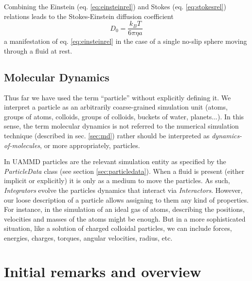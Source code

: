 \documentclass[ twoside,openright,titlepage,numbers=noenddot,%
headinclude,footinclude,cleardoublepage=empty,abstract=on,
BCOR=5mm,paper=a4,fontsize=11pt, dvipsnames
]{scrreprt}
\newcommand{\uammd}{\gls{UAMMD}\xspace}
\newcommand{\kT}{k_B T}
\begin{document}
Combining the Einstein (eq. \eqref{eq:einsteinrel}) and Stokes (eq. \eqref{eq:stokesrel}) relations leads to the Stokes-Einstein diffusion coefficient
\begin{equation}
  \label{eq:spherediff}
  D_0 = \frac{\kT}{6\pi\eta a}
\end{equation}
a manifestation of eq. \eqref{eq:einsteinrel} in the case of a single no-slip sphere moving through a fluid at rest.


\section{\uppercase{{\bfseries M}}olecular \uppercase{\textbf{D}}ynamics}\label{sec:dynmol}
Thus far we have used the term ``particle'' without explicitly defining it. We interpret a particle as an arbitrarily coarse-grained simulation unit (atoms, groups of atoms, colloids, groups of colloids, buckets of water, planets...). In this sense, the term molecular dynamics is not referred to the numerical simulation technique (described in sec. \ref{sec:md}) rather should be interpreted as \emph{dynamics-of-molecules}, or more appropriately, particles.

In \uammd particles are the relevant simulation entity as specified by the \emph{ParticleData} class (see section \ref{sec:particledata}). When a fluid is present (either implicit or explicitly) it is only as a medium to move the particles. As such, \emph{Integrators} evolve the particles dynamics that interact via \emph{Interactors}. However, our loose description of a particle allows assigning to them any kind of properties. For instance, in the simulation of an ideal gas of atoms, describing the positions, velocities and masses of the atoms might be enough. But in a more sophisticated situation, like a solution of charged colloidal particles, we can include forces, energies, charges, torques, angular velocities, radius, etc.



\chapter{Initial remarks and overview}

\end{document}
